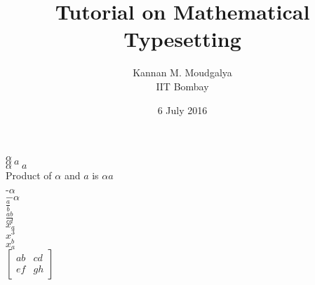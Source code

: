 \documentclass[12pt,a5paper]{article}
\title{Tutorial on Mathematical Typesetting}
\author{Kannan M. Moudgalya \\ IIT Bombay}
\date{6 July 2016}
\begin{document}
\maketitle
$\alpha$\\
$\alpha\ a$\\
$\alpha\quad a$\\
Product of $\alpha$ and $a$ is $\alpha a$ \\

-$\alpha$\\
$-\alpha$\\
$\frac a b$\\
$\frac{ab}{cd}$\\
$x_a$\\
$x^3$\\
$x_a^b$\\
$\begin{bmatrix}  %
{ab} & {cd}\\
{ef} & {gh}
\end{bmatrix}$
\end{document}
